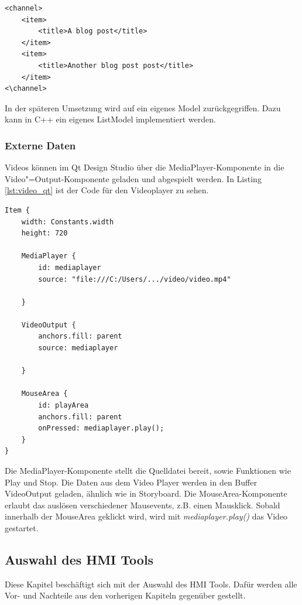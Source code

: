 \lstset{language=[5.0]Lua}
\begin{lstlisting}[frame=htrbl, caption={list.xml}, label={lst:list_xml}]
<channel>
	<item>
		<title>A blog post</title>
	</item>
	<item>
		<title>Another blog post post</title>
	</item>
<\channel>
\end{lstlisting}


In der späteren Umsetzung wird auf ein eigenes Model zurückgegriffen. Dazu kann in C++ ein eigenes ListModel implementiert werden.\\ 

\subsubsection{Externe Daten}
Videos können im Qt Design Studio über die MediaPlayer-Komponente in die Video"=Output-Komponente geladen und abgespielt werden. In Listing \ref{lst:video_qt} ist der Code für den Videoplayer zu sehen.\\

\lstset{language=[5.0]Lua}
\begin{lstlisting}[frame=htrbl, caption={VideoPlayer.qml}, label={lst:video_qt}]
Item {
	width: Constants.width
	height: 720

	MediaPlayer {
		id: mediaplayer
		source: "file:///C:/Users/.../video/video.mp4"

	}

	VideoOutput {
		anchors.fill: parent
		source: mediaplayer

	}

	MouseArea {
		id: playArea
		anchors.fill: parent
		onPressed: mediaplayer.play();
	}
}
\end{lstlisting}

Die MediaPlayer-Komponente stellt die Quelldatei bereit, sowie Funktionen wie Play und Stop. Die Daten aus dem Video Player werden in den Buffer VideoOutput geladen, ähnlich wie in Storyboard. Die MouseArea-Komponente erlaubt das auslösen verschiedener Mausevents, z.B. einen Mausklick. Sobald innerhalb der MouseArea geklickt wird, wird mit \textit{mediaplayer.play()} das Video gestartet.\\

\subsection{Auswahl des HMI Tools}

Diese Kapitel beschäftigt sich mit der Auswahl des HMI Tools. Dafür werden alle Vor- und Nachteile aus den vorherigen Kapiteln gegenüber gestellt.\\


